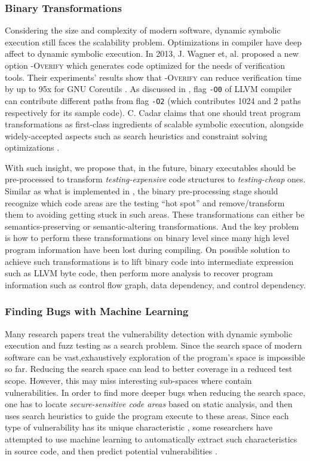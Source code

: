 \subsubsection{Binary Transformations}
Considering the size and complexity of modern software, dynamic symbolic execution still faces the scalability problem. 
 Optimizations in compiler have deep affect to dynamic symbolic execution. 
 In 2013, J. Wagner et, al. proposed a new option \textsc{-Overify} which generates code optimized for the needs of verification tools.
  Their experiments' results show that \textsc{-Overify} can reduce verification time by up to 95x for GNU Coreutils \cite{wagner2013overify}.
 As discussed in \cite{Cadar:2015:TPT}, flag \texttt{-O0} of LLVM compiler can contribute different paths from flag \texttt{-O2} (which contributes 1024 and 2 paths respectively for its sample code).
 C. Cadar claims that one should treat program transformations as first-class ingredients of scalable symbolic execution, alongside widely-accepted aspects such as search heuristics and constraint solving optimizations \cite{Cadar:2015:TPT}. 
 
With such insight, we propose that, in the future, binary executables should be pre-processed to transform \textit{testing-expensive} code structures to \textit{testing-cheap} ones.
  Similar as what is implemented in \cite{wagner2015high}, the binary pre-processing stage should recognize which code areas are the testing ``hot spot'' and remove/transform them to avoiding getting stuck in such areas.
  These transformations can either be semantics-preserving or semantic-altering transformations. 
 And the key problem is how to perform these transformations on binary level since many high level program information have been lost during compiling. 
 On possible solution to achieve such transformations is to lift binary code into intermediate expression such as LLVM byte code, then perform more analysis to recover program information such as control flow graph, data dependency, and control dependency. 

\subsubsection{Finding Bugs with Machine Learning}
Many research papers treat the vulnerability detection with dynamic symbolic execution and fuzz testing as a search problem.
 Since the search space of modern software can be vast,exhaustively exploration of the program's space is impossible so far.
 Reducing the search space can lead to better coverage in a reduced test scope.
 However, this may miss interesting sub-spaces where contain vulnerabilities. 
 In order to find more deeper bugs when reducing the search space, one has to locate \textit{secure-sensitive code areas} based on static analysis, and then uses search heuristics to guide the program execute to these areas.
 Since each type of vulnerability has its unique characteristic \cite{MBishop:ATBOC, wang2009intscope, wang2010ricb}, 
 some researchers have attempted to use machine learning to automatically extract such characteristics in source code, and then predict potential vulnerabilities \cite{VCCFinder, Yamaguchi:2011:VEA}.

